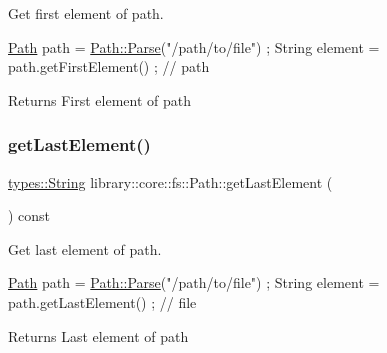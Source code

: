 Get first element of path. 


\begin{DoxyCode}
\hyperlink{classlibrary_1_1core_1_1fs_1_1Path_aaba9a8e0153813f08f78f1c3275734a4}{Path} path = \hyperlink{classlibrary_1_1core_1_1fs_1_1Path_aebf5bd3af83e0b7376616e146f3e55df}{Path::Parse}(\textcolor{stringliteral}{"/path/to/file"}) ;
String element = path.getFirstElement() ; \textcolor{comment}{// path}
\end{DoxyCode}


\begin{DoxyReturn}{Returns}
First element of path 
\end{DoxyReturn}
\mbox{\label{classlibrary_1_1core_1_1fs_1_1Path_a3e29def9459dd51f1c359435aae4ead1}} 
\subsubsection{\texorpdfstring{get\+Last\+Element()}{getLastElement()}}
{\footnotesize\ttfamily \hyperlink{classlibrary_1_1core_1_1types_1_1String}{types\+::\+String} library\+::core\+::fs\+::\+Path\+::get\+Last\+Element (\begin{DoxyParamCaption}{ }\end{DoxyParamCaption}) const}



Get last element of path. 


\begin{DoxyCode}
\hyperlink{classlibrary_1_1core_1_1fs_1_1Path_aaba9a8e0153813f08f78f1c3275734a4}{Path} path = \hyperlink{classlibrary_1_1core_1_1fs_1_1Path_aebf5bd3af83e0b7376616e146f3e55df}{Path::Parse}(\textcolor{stringliteral}{"/path/to/file"}) ;
String element = path.getLastElement() ; \textcolor{comment}{// file}
\end{DoxyCode}


\begin{DoxyReturn}{Returns}
Last element of path 
\end{DoxyReturn}
\mbox{\label{classlibrary_1_1core_1_1fs_1_1Path_a920b1d062cb1274da811150afafba124}} 
